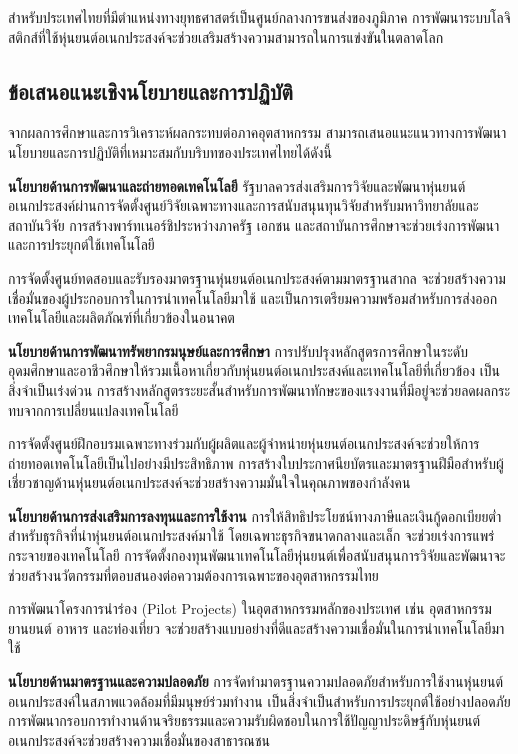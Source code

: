\documentclass[a4paper]{article}
\begin{document}
สำหรับประเทศไทยที่มีตำแหน่งทางยุทธศาสตร์เป็นศูนย์กลางการขนส่งของภูมิภาค การพัฒนาระบบโลจิสติกส์ที่ใช้หุ่นยนต์อเนกประสงค์จะช่วยเสริมสร้างความสามารถในการแข่งขันในตลาดโลก

\subsection{ข้อเสนอแนะเชิงนโยบายและการปฏิบัติ}

จากผลการศึกษาและการวิเคราะห์ผลกระทบต่อภาคอุตสาหกรรม สามารถเสนอแนะแนวทางการพัฒนานโยบายและการปฏิบัติที่เหมาะสมกับบริบทของประเทศไทยได้ดังนี้

\textbf{นโยบายด้านการพัฒนาและถ่ายทอดเทคโนโลยี} รัฐบาลควรส่งเสริมการวิจัยและพัฒนาหุ่นยนต์อเนกประสงค์ผ่านการจัดตั้งศูนย์วิจัยเฉพาะทางและการสนับสนุนทุนวิจัยสำหรับมหาวิทยาลัยและสถาบันวิจัย การสร้างพาร์ทเนอร์ชิประหว่างภาครัฐ เอกชน และสถาบันการศึกษาจะช่วยเร่งการพัฒนาและการประยุกต์ใช้เทคโนโลยี

การจัดตั้งศูนย์ทดสอบและรับรองมาตรฐานหุ่นยนต์อเนกประสงค์ตามมาตรฐานสากล \parencite{iso2025robotics} จะช่วยสร้างความเชื่อมั่นของผู้ประกอบการในการนำเทคโนโลยีมาใช้ และเป็นการเตรียมความพร้อมสำหรับการส่งออกเทคโนโลยีและผลิตภัณฑ์ที่เกี่ยวข้องในอนาคต

\textbf{นโยบายด้านการพัฒนาทรัพยากรมนุษย์และการศึกษา} การปรับปรุงหลักสูตรการศึกษาในระดับอุดมศึกษาและอาชีวศึกษาให้รวมเนื้อหาเกี่ยวกับหุ่นยนต์อเนกประสงค์และเทคโนโลยีที่เกี่ยวข้อง เป็นสิ่งจำเป็นเร่งด่วน การสร้างหลักสูตรระยะสั้นสำหรับการพัฒนาทักษะของแรงงานที่มีอยู่จะช่วยลดผลกระทบจากการเปลี่ยนแปลงเทคโนโลยี

การจัดตั้งศูนย์ฝึกอบรมเฉพาะทางร่วมกับผู้ผลิตและผู้จำหน่ายหุ่นยนต์อเนกประสงค์จะช่วยให้การถ่ายทอดเทคโนโลยีเป็นไปอย่างมีประสิทธิภาพ การสร้างใบประกาศนียบัตรและมาตรฐานฝีมือสำหรับผู้เชี่ยวชาญด้านหุ่นยนต์อเนกประสงค์จะช่วยสร้างความมั่นใจในคุณภาพของกำลังคน

\textbf{นโยบายด้านการส่งเสริมการลงทุนและการใช้งาน} การให้สิทธิประโยชน์ทางภาษีและเงินกู้ดอกเบียยต่ำสำหรับธุรกิจที่นำหุ่นยนต์อเนกประสงค์มาใช้ โดยเฉพาะธุรกิจขนาดกลางและเล็ก จะช่วยเร่งการแพร่กระจายของเทคโนโลยี การจัดตั้งกองทุนพัฒนาเทคโนโลยีหุ่นยนต์เพื่อสนับสนุนการวิจัยและพัฒนาจะช่วยสร้างนวัตกรรมที่ตอบสนองต่อความต้องการเฉพาะของอุตสาหกรรมไทย

การพัฒนาโครงการนำร่อง (Pilot Projects) ในอุตสาหกรรมหลักของประเทศ เช่น อุตสาหกรรมยานยนต์ อาหาร และท่องเที่ยว จะช่วยสร้างแบบอย่างที่ดีและสร้างความเชื่อมั่นในการนำเทคโนโลยีมาใช้

\textbf{นโยบายด้านมาตรฐานและความปลอดภัย} การจัดทำมาตรฐานความปลอดภัยสำหรับการใช้งานหุ่นยนต์อเนกประสงค์ในสภาพแวดล้อมที่มีมนุษย์ร่วมทำงาน เป็นสิ่งจำเป็นสำหรับการประยุกต์ใช้อย่างปลอดภัย การพัฒนากรอบการทำงานด้านจริยธรรมและความรับผิดชอบในการใช้ปัญญาประดิษฐ์กับหุ่นยนต์อเนกประสงค์จะช่วยสร้างความเชื่อมั่นของสาธารณชน
\end{document}
